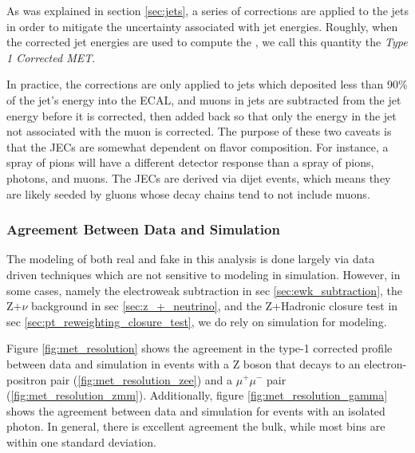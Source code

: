       As was explained in section \ref{sec:jets}, a series of corrections are applied to the jets in order to mitigate the uncertainty associated with jet energies. Roughly, when the corrected jet energies are used to compute the \MET, we call this quantity the \emph{Type 1 Corrected MET}. 

      In practice, the corrections are only applied to jets which deposited less than 90\% of the jet's energy into the ECAL, and muons in jets are subtracted from the jet energy before it is corrected, then added back so that only the energy in the jet not associated with the muon is corrected. The purpose of these two caveats is that the JECs are somewhat dependent on flavor composition. For instance, a spray of pions will have a different detector response than a spray of pions, photons, and muons. The JECs are derived via dijet events, which means they are likely seeded by gluons whose decay chains tend to not include muons.

    \subsubsection{Agreement Between Data and Simulation}

      The modeling of both real and fake \MET in this analysis is done largely via data driven techniques which are not sensitive to \MET modeling in simulation. However, in some cases, namely the electroweak subtraction in sec \ref{sec:ewk_subtraction}, the Z$+\nu$ background in sec \ref{sec:z_+_neutrino}, and the Z+Hadronic closure test in sec \ref{sec:pt_reweighting_closure_test}, we do rely on simulation for \MET modeling.

      Figure \ref{fig:met_resolution} shows the agreement in the type-1 corrected \MET profile between data and simulation in events with a Z boson that decays to an electron-positron pair (\ref{fig:met_resolution_zee}) and a $\mu^+ \mu^-$ pair (\ref{fig:met_resolution_zmm}). Additionally, figure \ref{fig:met_resolution_gamma} shows the agreement between data and simulation for events with an isolated photon. In general, there is excellent agreement the bulk, while most bins are within one standard deviation.


